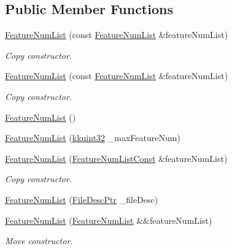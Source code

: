 \subsection*{Public Member Functions}
\begin{DoxyCompactItemize}
\item 
\hyperlink{class_k_k_m_l_l_1_1_feature_num_list_a08251c36cb1b7a47af1f984ae6ea80f2}{Feature\+Num\+List} (const \hyperlink{class_k_k_m_l_l_1_1_feature_num_list}{Feature\+Num\+List} \&feature\+Num\+List)
\begin{DoxyCompactList}\small\item\em Copy constructor. \end{DoxyCompactList}\item 
\hyperlink{class_k_k_m_l_l_1_1_feature_num_list_a70951060c7f0748be38e5199b25aa61e}{Feature\+Num\+List} (const \hyperlink{class_k_k_m_l_l_1_1_feature_num_list}{Feature\+Num\+List} \&feature\+Num\+List)
\begin{DoxyCompactList}\small\item\em Copy constructor. \end{DoxyCompactList}\item 
\hyperlink{class_k_k_m_l_l_1_1_feature_num_list_af5d957089c38e96571e261eb77d7faff}{Feature\+Num\+List} ()
\item 
\hyperlink{class_k_k_m_l_l_1_1_feature_num_list_a57fee824ee2248ffaeeec34ef366f325}{Feature\+Num\+List} (\hyperlink{namespace_k_k_b_af8d832f05c54994a1cce25bd5743e19a}{kkuint32} \+\_\+max\+Feature\+Num)
\item 
\hyperlink{class_k_k_m_l_l_1_1_feature_num_list_acb966b39928df7d341227bfa43a826f8}{Feature\+Num\+List} (\hyperlink{class_k_k_m_l_l_1_1_feature_num_list_a2a39685c8a0cb219f57f9b256c92ed5c}{Feature\+Num\+List\+Const} \&feature\+Num\+List)
\begin{DoxyCompactList}\small\item\em Copy constructor. \end{DoxyCompactList}\item 
\hyperlink{class_k_k_m_l_l_1_1_feature_num_list_a90b9bed3a4103eecaeacbdd01440eb7b}{Feature\+Num\+List} (\hyperlink{namespace_k_k_m_l_l_aa0d0b6ab4ec18868a399b8455b05d914}{File\+Desc\+Ptr} \+\_\+file\+Desc)
\item 
\hyperlink{class_k_k_m_l_l_1_1_feature_num_list_a495a2ce5372901a42a1e4ef1fa554db6}{Feature\+Num\+List} (\hyperlink{class_k_k_m_l_l_1_1_feature_num_list}{Feature\+Num\+List} \&\&feature\+Num\+List)
\begin{DoxyCompactList}\small\item\em Move constructor. \end{DoxyCompactList}\item 

\end{DoxyCompactItemize}
